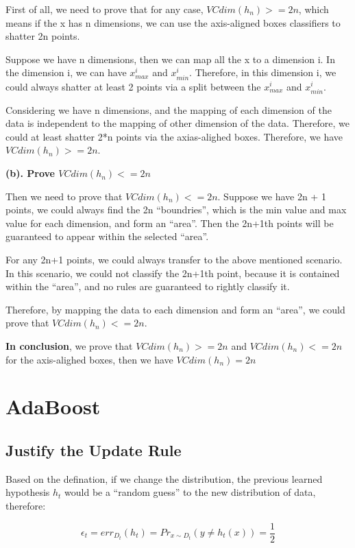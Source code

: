 \documentclass{article} %
\begin{document}
First of all, we need to prove that for any case, $VCdim(h_n) >= 2n$, which
means if the x has n dimensions, we can use the axis-aligned boxes classifiers
to shatter 2n points.

Suppose we have n dimensions, then we can map all the x to a dimension i. In the
dimension i, we can have $x^i_{max}$ and $x^i_{min}$. Therefore, in this
dimension i, we could always shatter at least 2 points via a split between the
$x^i_{max}$ and $x^i_{min}$.

Considering we have n dimensions, and the mapping of each dimension of the data is
independent to the mapping of other dimension of the data. Therefore, we could
at least shatter 2*n points via the axias-alighed boxes. Therefore, we have
$VCdim(h_n) >= 2n$.

\textbf{(b). Prove $VCdim(h_n) <= 2n$}

Then we need to prove that $VCdim(h_n) <= 2n$. Suppose we have 2n + 1 points, we
could always find the 2n ``boundries'', which is the min value and max value for
each dimension, and form an ``area''. Then the 2n+1th points will be guaranteed to
appear within the selected ``area''.

For any 2n+1 points, we could always transfer to the above mentioned scenario. In
this scenario, we could not classify the 2n+1th point, because it is contained
within the ``area'', and no rules are guaranteed to rightly classify it.

Therefore, by mapping the data to each dimension and form an ``area'', we could
prove that $VCdim(h_n) <= 2n$.

\textbf{In conclusion}, we prove that $VCdim(h_n) >= 2n$ and $VCdim(h_n) <= 2n$ for the
axis-alighed boxes, then we have $VCdim(h_n) = 2n$



\section{AdaBoost}


\subsection{Justify the Update Rule}
Based on the defination, if we change the distribution, the previous
learned hypothesis $h_t$ would be a ``random guess'' to the new distribution of
data, therefore:

\begin{equation}
\epsilon_t = err_{D_t} (h_t) = Pr_{x \sim D_t} (y \neq h_t (x)) = \frac{1}{2}
\end{equation}
\end{document}
